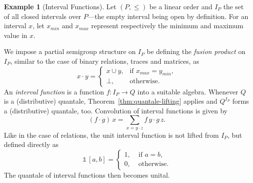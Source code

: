 \documentclass[12pt]{article}
\theoremstyle{definition}
\newtheorem{example}{Example}
\newcommand{\unit}{\mathbb{1}}
\begin{document}
\begin{example}[Interval Functions]\label{ex:interval-functions}
  Let $(P,\le)$ be a linear order and $I_P$ the set of all closed
  intervals over $P$---the empty interval being open by definition.
  For an interval $x$, let $x_{min}$ and $x_{max}$ represent 
  respectively the minimum and maximum value in $x$.

  We impose a partial semigroup structure on $I_P$ be defining the
  \emph{fusion product} on $I_P$, similar to the case of binary
  relations, traces and matrices, as
\begin{equation*}
  x \cdot y = 
    \begin{cases}
      x \cup y, & \text{if } x_{max} = y_{min}, \\
      \bot,       & \text{otherwise}.
    \end{cases}
\end{equation*}
An \emph{interval function} is a function $f:I_P\to Q$ into a suitable
algebra. Whenever $Q$ is a (distributive) quantale,
Theorem~\ref{thm:quantale-lifting} applies and $Q^{I_P}$ forms a
(distributive) quantale, too. Convolution of interval functions is
given by
\begin{equation*}
  (f\cdot g)\, x = \sum_{x = y \cdot z} f\, y \cdot g\, z. 
\end{equation*}
Like in the case of relations, the unit interval function is not
lifted from $I_P$, but defined directly as
\begin{equation*}
  \unit\, [a,b] = 
  \begin{cases}
    1, & \text{ if } a=b,\\
    0, & \text{ otherwise}.
  \end{cases}
\end{equation*}
The quantale of interval functions then becomes unital.


\end{example}
\end{document}
